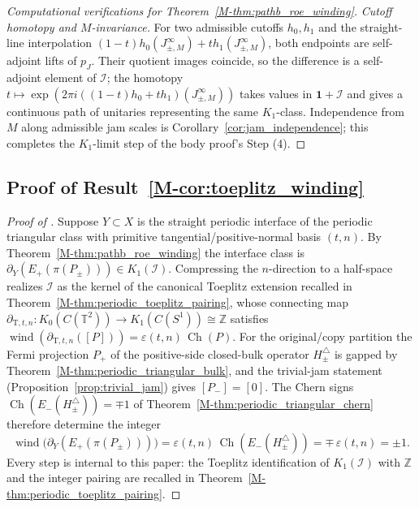 \documentclass[11pt]{article}
\numberwithin{equation}{section}
\theoremstyle{definition}
\theoremstyle{remark}
\newcommand{\Id}{\mathbf{1}}
\newcommand{\Ch}{\operatorname{Ch}}
\begin{document}
\begin{proof}[Computational verifications for Theorem~\ref{M-thm:pathb_roe_winding}]
\smallskip\textit{Cutoff homotopy and \(M\)-invariance.}
For two admissible cutoffs \(h_0,h_1\) and the straight-line interpolation
\((1-t)h_0(J_{\pm,M}^\infty)+t h_1(J_{\pm,M}^\infty)\), both endpoints are self-adjoint lifts of
\(p_J\). Their quotient images coincide, so the difference is a self-adjoint element of
\(\mathcal I\); the homotopy
\(t\mapsto\exp(2\pi i((1-t)h_0+th_1)(J_{\pm,M}^\infty))\) takes values in \(\Id+\mathcal I\) and
gives a continuous path of unitaries representing the same \(K_1\)-class. Independence from
\(M\) along admissible jam scales is Corollary~\ref{cor:jam_independence}; this completes the
\(K_1\)-limit step of the body proof's Step (4).
\end{proof}

\subsection{Proof of Result~\ref{M-cor:toeplitz_winding}}\label{app:proof:cor:toeplitz_winding}
\begin{proof}[Proof of ]
Suppose \(Y\subset X\) is the straight periodic interface of the periodic triangular class with
primitive tangential/positive-normal basis \((t,n)\). By Theorem~\ref{M-thm:pathb_roe_winding}
the interface class is \(\partial_Y(E_+(\pi(P_\pm)))\in K_1(\mathcal I)\). Compressing the
\(n\)-direction to a half-space realizes \(\mathcal I\) as the kernel of the canonical Toeplitz
extension recalled in Theorem~\ref{M-thm:periodic_toeplitz_pairing}, whose connecting map
\(\partial_{\mathrm T,t,n}:K_0(C(\mathbb T^2))\to K_1(C(S^1))\cong\mathbb Z\) satisfies
\(\operatorname{wind}\!\left(\partial_{\mathrm T,t,n}([P])\right)=\varepsilon(t,n)\,\Ch(P)\). For
the original/copy partition the Fermi projection \(P_+\) of the positive-side closed-bulk
operator \(H_\pm^\triangle\) is gapped by Theorem~\ref{M-thm:periodic_triangular_bulk}, and the
trivial-jam statement (Proposition~\ref{prop:trivial_jam}) gives \([P_-]=[0]\). The Chern signs
\(\Ch(E_-(H_\pm^\triangle))=\mp1\) of Theorem~\ref{M-thm:periodic_triangular_chern} therefore
determine the integer
\[
\operatorname{wind}\bigl(\partial_Y(E_+(\pi(P_\pm)))\bigr)
=\varepsilon(t,n)\,\Ch(E_-(H_\pm^\triangle))
=\mp\,\varepsilon(t,n)=\pm1.
\]
Every step is internal to this paper: the Toeplitz identification of \(K_1(\mathcal I)\) with
\(\mathbb Z\) and the integer pairing are recalled in Theorem~\ref{M-thm:periodic_toeplitz_pairing}.
\end{proof}
\end{document}
